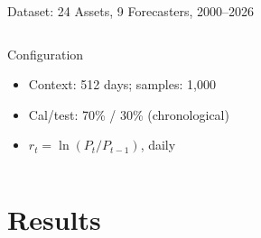 \documentclass[9pt, aspectratio=169, t]{beamer}
\begin{document}
\begin{frame}{Dataset: 24 Assets, 9 Forecasters, 2000--2026}
{\begin{columns}[T]
		\begin{block}{Configuration}
		\begin{itemize}\setlength{\itemsep}{0pt}
			\item Context: 512 days; samples: 1{,}000
			\item Cal/test: 70\% / 30\% (chronological)
			\item $r_t = \ln(P_t / P_{t-1})$, daily
		\end{itemize}
		\end{block}
	\end{columns}
	}
\end{frame}


\section{Results}
\end{document}

